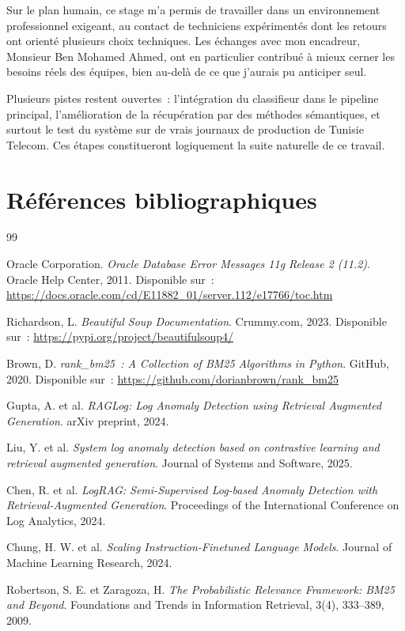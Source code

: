 \documentclass[12pt,a4paper]{report}
\begin{document}
Sur le plan humain, ce stage m'a permis de travailler dans un environnement
professionnel exigeant, au contact de techniciens exp\'eriment\'es dont les retours ont
orient\'e plusieurs choix techniques. Les \'echanges avec mon encadreur, Monsieur Ben
Mohamed Ahmed, ont en particulier contribu\'e \`a mieux cerner les besoins r\'eels
des \'equipes, bien au-del\`a de ce que j'aurais pu anticiper seul.

Plusieurs pistes restent ouvertes~: l'int\'egration du classifieur dans le pipeline
principal, l'am\'elioration de la r\'ecup\'eration par des m\'ethodes s\'emantiques,
et surtout le test du syst\`eme sur de vrais journaux de production de Tunisie Telecom.
Ces \'etapes constitueront logiquement la suite naturelle de ce travail.

\chapter*{R\'ef\'erences bibliographiques}

\begin{thebibliography}{99}

Oracle Corporation.
\textit{Oracle Database Error Messages 11g Release 2 (11.2)}.
Oracle Help Center, 2011.
Disponible sur~: \url{https://docs.oracle.com/cd/E11882_01/server.112/e17766/toc.htm}

Richardson, L.
\textit{Beautiful Soup Documentation}.
Crummy.com, 2023.
Disponible sur~: \url{https://pypi.org/project/beautifulsoup4/}

Brown, D.
\textit{rank\_bm25~: A Collection of BM25 Algorithms in Python}.
GitHub, 2020.
Disponible sur~: \url{https://github.com/dorianbrown/rank_bm25}

Gupta, A. et al.
\textit{RAGLog: Log Anomaly Detection using Retrieval Augmented Generation}.
arXiv preprint, 2024.

Liu, Y. et al.
\textit{System log anomaly detection based on contrastive learning and retrieval
augmented generation}.
Journal of Systems and Software, 2025.

Chen, R. et al.
\textit{LogRAG: Semi-Supervised Log-based Anomaly Detection with
Retrieval-Augmented Generation}.
Proceedings of the International Conference on Log Analytics, 2024.

Chung, H. W. et al.
\textit{Scaling Instruction-Finetuned Language Models}.
Journal of Machine Learning Research, 2024.

Robertson, S. E. et Zaragoza, H.
\textit{The Probabilistic Relevance Framework: BM25 and Beyond}.
Foundations and Trends in Information Retrieval, 3(4), 333--389, 2009.

\end{thebibliography}
\end{document}
